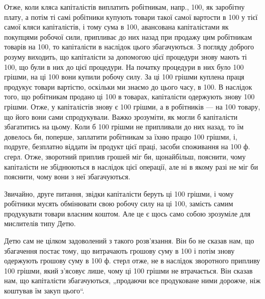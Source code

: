 Отже, коли кляса капіталістів виплатить робітникам, напр., 100,
як заробітну плату, а потім ті самі робітники купують товари такої самої
вартости в 100 у тієї самої кляси капіталістів, і тому сума
в 100, авансована капіталістами як покупцями робочої сили,
припливає до них назад при продажу цим робітникам товарів на 100, то капіталісти в наслідок цього збагачуються. З погляду
доброго розуму виходить, що капіталісти за допомогою цієї процедури
знову мають ті 100, що були в них до цієї процедури. На
початку процедури в них було 100 грішми, на ці 100
вони купили робочу силу. За ці 100 грішми куплена праця
продукує товари вартістю, оскільки ми знаємо до цього часу, в 100. В наслідок того, що робітникам продано ці 100 в товарах,
капіталісти одержують знову 100 грішми. Отже, у капіталістів
знову є 100 грішми, а в робітників — на 100
товару, що його вони сами спродукували. Важко зрозуміти, як могли б
капіталісти збагатитись на цьому. Коли б 100 грішми не припливали
до них назад, то їм довелось би, поперше, заплатити робітникам
за їхню працю 100 грішми, і, подруге, безплатно віддати
їм продукт цієї праці, засоби споживання на 100 ф. сгерл. Отже, зворотний
приплив грошей міг би, щонайбільш, пояснити, чому капіталісти
не збіднюються в наслідок цієї операції, але ні в якому разі не міг би
пояснити, чому вони з неї збагачуються.

Звичайно, друге питання, звідки капіталісти беруть ці 100
грішми, і чому робітники мусять обмінювати свою робочу силу на ці 100, замість самим продукувати товари власним коштом. Але це є щось
само собою зрозуміле для мислителів типу Детю.

Детю сам не цілком задоволений з такого розв’язання. Він бо не
сказав нам, що збагачення постає тому, що витрачають грошову суму
в 100 і потім знову одержують грошову суму в 100 ф. стерл
отже, не в наслідок зворотного припливу 100 грішми, який
з’ясовує лише, чому ці 100 грішми не втрачається. Він сказав
нам, що капіталісти збагачуються, „продаючи все продуковане ними
дорожче, ніж коштував їм закуп цього“.

